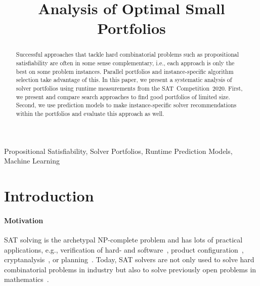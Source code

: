 \documentclass[conference]{IEEEtran}
\begin{document}
\title{Analysis of Optimal Small Portfolios}

\author{
\and
{}
}

\maketitle

\begin{abstract}
Successful approaches that tackle hard combinatorial problems such as propositional satisfiability are often in some sense complementary, i.e., each approach is only the best on some problem instances. 
Parallel portfolios and instance-specific algorithm selection take advantage of this. 
In this paper, we present a systematic analysis of solver portfolios using runtime measurements from the SAT~Competition~2020. 
First, we present and compare search approaches to find good portfolios of limited size.
Second, we use prediction models to make instance-specific solver recommendations within the portfolios and evaluate this approach as well.
\end{abstract}

\begin{IEEEkeywords}
Propositional Satisfiability, Solver Portfolios, Runtime Prediction Models, Machine Learning
\end{IEEEkeywords}

\section{Introduction}
\label{sec:introduction}

\paragraph{Motivation}

SAT solving is the archetypal NP-complete problem and has lots of practical applications, e.g., verification of hard- and software~\cite{Kaufmann:2021:Amulet,Buning:2020:QPRVerify}, product configuration~\cite{Janota:2014:Configuration}, cryptanalysis~\cite{Nejati:2020:CDCLCrypto}, or planning~\cite{Schreiber:2021:Lilotane}. 
Today, SAT solvers are not only used to solve hard combinatorial problems in industry but also to solve previously open problems in mathematics~\cite{Heule:2016:Pyth,Heule:2018:Schur}. 
\end{document}
